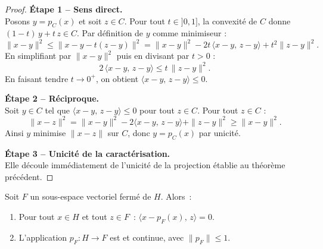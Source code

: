 \documentclass[11pt,a4paper]{article}
\begin{document}
\begin{proof}
\noindent
\textbf{Étape 1 -- Sens direct.}\\
Posons $y = p_C(x)$ et soit $z \in C$. Pour tout $t \in ]0,1]$, la convexité de $C$
donne $(1-t)\,y + t\,z \in C$. Par définition de $y$ comme minimiseur :
\[
\|x - y\|^2 \leq \|x - y - t(z - y)\|^2
= \|x - y\|^2 - 2t\,\langle x - y,\, z - y\rangle + t^2\|z - y\|^2.
\]
En simplifiant par $\|x-y\|^2$ puis en divisant par $t > 0$ :
\[
2\,\langle x - y,\, z - y\rangle \leq t\,\|z - y\|^2.
\]
En faisant tendre $t \to 0^+$, on obtient $\langle x - y,\, z - y\rangle \leq 0$.

\textbf{Étape 2 -- Réciproque.}\\
Soit $y \in C$ tel que $\langle x - y,\, z - y\rangle \leq 0$ pour tout $z \in C$.
Pour tout $z \in C$ :
\[
\|x - z\|^2 = \|x - y\|^2 - 2\langle x - y,\, z - y\rangle + \|z - y\|^2 \geq \|x - y\|^2.
\]
Ainsi $y$ minimise $\|x - z\|$ sur $C$, donc $y = p_C(x)$ par unicité.

\textbf{Étape 3 -- Unicité de la caractérisation.}\\
Elle découle immédiatement de l'unicité de la projection établie au théorème précédent.
\end{proof}

\begin{proposition}
Soit $F$ un sous-espace vectoriel fermé de $H$. Alors~:
\begin{enumerate}
\item Pour tout $x \in H$ et tout $z \in F$~:
$\langle x - p_F(x),\, z \rangle = 0$.
\item L'application $p_F : H \to F$ est  et continue,
avec $\|p_F\| \leq 1$.
\end{enumerate}
\end{proposition}
\end{document}
